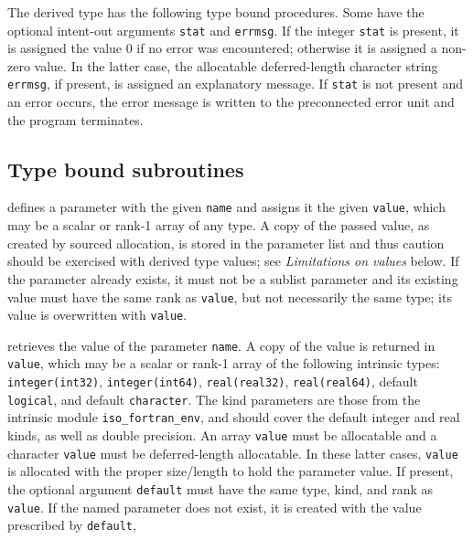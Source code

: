 \documentclass[11pt]{article}
\begin{document}
The derived type has the following type bound procedures.  Some have the
optional intent-out arguments \texttt{stat} and \texttt{errmsg}.  If the
integer \texttt{stat} is present, it is assigned the value 0 if no error
was encountered; otherwise it is assigned a non-zero value.  In the latter
case, the allocatable deferred-length character string \texttt{errmsg},
if present, is assigned an explanatory message.  If \texttt{stat} is not
present and an error occurs, the error message is written to the preconnected
error unit and the program terminates.

\subsection{Type bound subroutines}
\begin{description}[style=nextline]\setlength{\itemsep}{0pt}
\item[\texttt{set(name, value \Lbr,stat \Lbr,errmsg\Rbr\Rbr)}]
  defines a parameter with the given \texttt{name} and assigns it the given
  \texttt{value}, which may be a scalar or rank-1 array of any type.  A copy
  of the passed value, as created by sourced allocation, is stored in the
  parameter list and thus caution should be exercised with derived type values; see
  \emph{Limitations on values} below.  If the parameter already exists, it must
  not be a sublist parameter and its existing value must have the same rank as
  \texttt{value}, but not necessarily the same type; its value is overwritten
  with \texttt{value}.
\item[\texttt{get(name, value \Lbr,default\Rbr\ \Lbr,stat \Lbr,errmsg\Rbr\Rbr)}]
  retrieves the value of the parameter \texttt{name}.  A copy of the value is
  returned in \texttt{value}, which may be a scalar or rank-1 array of the
  following intrinsic types: \texttt{integer(int32)}, \texttt{integer(int64)},
  \texttt{real(real32)}, \texttt{real(real64)}, default \texttt{logical}, and
  default \texttt{character}.  The kind parameters are those from the intrinsic module
  \texttt{iso_fortran_env}, and should cover the default integer and real kinds,
  as well as double precision.  An array \texttt{value} must be allocatable and
  a character \texttt{value} must be deferred-length allocatable.  In these
  latter cases, \texttt{value} is allocated with the proper size/length to hold
  the parameter value.  If present, the optional argument \texttt{default} must
  have the same type, kind, and rank as \texttt{value}. If the named parameter
  does not exist, it is created with the value prescribed by \texttt{default},

\end{description}
\end{document}
